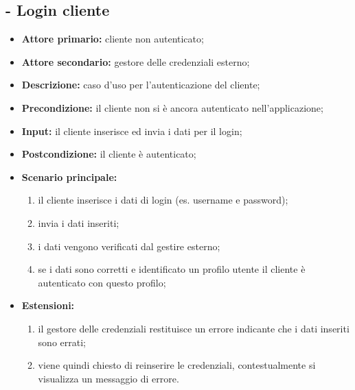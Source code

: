 \subsection{ - Login cliente}
\begin{itemize}
    \item \textbf{Attore primario:} cliente non autenticato;
    \item \textbf{Attore secondario:} gestore delle credenziali esterno;
    \item \textbf{Descrizione:} caso d'uso per l'autenticazione del cliente;
    \item \textbf{Precondizione:} il cliente non si è ancora autenticato nell'applicazione;
    \item \textbf{Input:} il cliente inserisce ed invia i dati per il login;
    \item \textbf{Postcondizione:} il cliente è autenticato;
    \item \textbf{Scenario principale:}
          \begin{enumerate}
              \item il cliente inserisce i dati di login (es. username e password);
              \item invia i dati inseriti;
              \item i dati vengono verificati dal gestire esterno;
              \item se i dati sono corretti e identificato un profilo utente il cliente è autenticato con questo profilo;
          \end{enumerate}
    \item \textbf{Estensioni:}
          \begin{enumerate}
              \item il gestore delle credenziali restituisce un errore indicante che i dati inseriti sono errati;
              \item viene quindi chiesto di reinserire le credenziali, contestualmente si visualizza un messaggio di errore.
          \end{enumerate}
\end{itemize}

\stepUserCase

